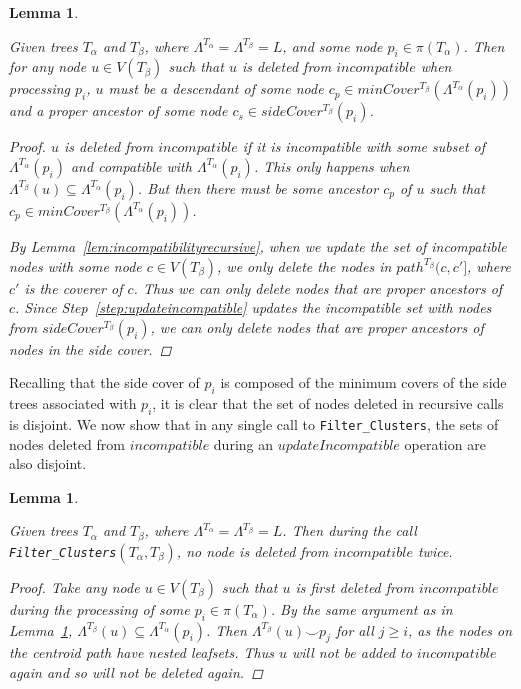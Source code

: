 \documentclass[12pt,a4paper]{article}
\newcommand{\compatible}{\smile}
\newcommand{\leafset}{\Lambda}
\newcommand{\TA}{T_\alpha}
\newcommand{\TB}{T_\beta}
\newtheorem{numremovednodesrecursive}[incompatibility]{Lemma}
\newtheorem{numremovednodescentroid}[incompatibility]{Lemma}
\begin{document}
    \begin{numremovednodesrecursive}
        \label{lem:numremovednodesrecursive}

        Given trees $\TA$ and $\TB$, where $\leafset^{\TA} = \leafset^{\TB} = L$, and some node $p_i \in \pi(\TA)$. Then for any node $u \in V(\TB)$ such that $u$ is deleted from $incompatible$ when processing $p_i$, $u$ must be a descendant of some node $c_{p} \in minCover^{\TB}(\leafset^{\TA}(p_i))$ and a proper ancestor of some node $c_s \in sideCover^{\TB}(p_i)$.

        \begin{proof}
            $u$ is deleted from $incompatible$ if it is incompatible with some subset of $\leafset^{\TA}(p_i)$ and compatible with $\leafset^{\TA}(p_i)$. This only happens when $\leafset^{\TB}(u) \subseteq \leafset^{\TA}(p_i)$. But then there must be some ancestor $c_p$ of $u$ such that $c_p \in minCover^{\TB}(\leafset^{\TA}(p_i))$.

            By Lemma~\ref{lem:incompatibilityrecursive}, when we update the set of incompatible nodes with some node $c \in V(\TB)$, we only delete the nodes in $path^{\TB}(c, c']$, where $c'$ is the coverer of $c$. Thus we can only delete nodes that are proper ancestors of $c$. Since Step~\ref{step:updateincompatible} updates the incompatible set with nodes from $sideCover^{\TB}(p_i)$, we can only delete nodes that are proper ancestors of nodes in the side cover.
        \end{proof}
    \end{numremovednodesrecursive}

    Recalling that the side cover of $p_i$ is composed of the minimum covers of the side trees associated with $p_i$, it is clear that the set of nodes deleted in recursive calls is disjoint. We now show that in any single call to \texttt{Filter\_Clusters}, the sets of nodes deleted from $incompatible$ during an $updateIncompatible$ operation are also disjoint.
    \newline

    \begin{numremovednodescentroid}
        \label{lem:numremovednodescentroid}

        Given trees $\TA$ and $\TB$, where $\leafset^{\TA} = \leafset^{\TB} = L$. Then during the call \texttt{Filter\_Clusters}$(\TA, \TB)$, no node is deleted from $incompatible$ twice.

        \begin{proof}
            Take any node $u \in V(\TB)$ such that $u$ is first deleted from $incompatible$ during the processing of some $p_i \in \pi(\TA)$. By the same argument as in Lemma~\ref{lem:numremovednodesrecursive}, $\leafset^{\TB}(u) \subseteq \leafset^{\TA}(p_i)$. Then $\leafset^{\TB}(u) \compatible p_j$ for all $j \geq i$, as the nodes on the centroid path have nested leafsets. Thus $u$ will not be added to $incompatible$ again and so will not be deleted again.
        \end{proof}
    \end{numremovednodescentroid}
\end{document}
